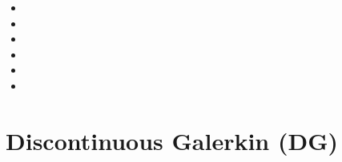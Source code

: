 \begin{small}
\begin{itemize}
\item[\twothousandseven]     
\item[\twothousandten]       
\item[\twothousandeleven]    
\item[\twothousandfifteen]   
\item[\twothousandnineteen]  
\item[\twothousandtwentyone] 
\end{itemize}
\end{small}




\section{Discontinuous Galerkin (DG)}

